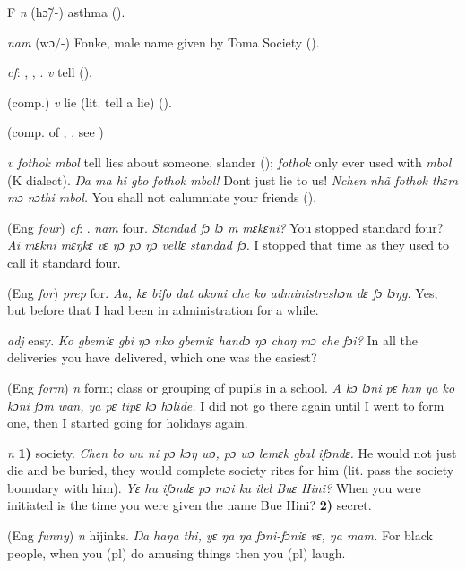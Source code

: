 \begin{letter}{F}
 \textit{n} (hɔ̃/-) asthma (\citealt{Pichl1967}).

 \textit{nam} (wɔ/-) Fonke, male name given by Toma Society (\citealt{Pichl1967}). 

 \textit{cf}: , , . \textit{v} tell (\citealt{Pichl1967}).

 (comp.) \textit{v} lie (lit. tell a lie) (\citealt{Pichl1967}). 

 (comp. of , , see ) 

 \textit{v} \textit{fothok mbol} tell lies about someone, slander (\citealt{Pichl1967}); \textit{fothok} only ever used with \textit{mbol} (K dialect). \textit{Ŋa ma hi gbo fothok mbol!} Dont just lie to us! \textit{Nchen nhã fothok thɛm mɔ nɔthi mbol.} You shall not calumniate your friends (\citealt{Pichl1967}). 

 (Eng \textit{four}) \textit{cf}: . \textit{nam} four. \textit{Standad fɔ lɔ m mɛkɛni?} You stopped standard four? \textit{Ai mɛkni mɛŋkɛ vɛ ŋɔ pɔ ŋɔ vellɛ standad fɔ.} I stopped that time as they used to call it standard four.

 (Eng \textit{for}) \textit{prep} for. \textit{Aa, kɛ bifo dat akoni che ko administreshɔn dɛ fɔ lɔŋg.} Yes, but before that I had been in administration for a while.

 \textit{adj} easy. \textit{Ko gbemiɛ gbi ŋɔ nko gbemiɛ handɔ ŋɔ chaŋ mɔ che fɔi?} In all the deliveries you have delivered, which one was the easiest?

 (Eng \textit{form}) \textit{n} form; class or grouping of pupils in a school. \textit{A kɔ lɔni pɛ haŋ ya ko kɔni fɔm wan, ya pɛ tipɛ kɔ hɔlide.} I did not go there again until I went to form one, then I started going for holidays again.

 \textit{n} \textbf{1)} society. \textit{Chen bo wu ni pɔ kɔŋ wɔ, pɔ wɔ lemɛk gbal ifɔndɛ.} He would not just die and be buried, they would complete society rites for him (lit. pass the society boundary with him). \textit{Yɛ hu ifɔndɛ pɔ mɔi ka ilel Buɛ Hini?} When you were initiated is the time you were given the name Bue Hini? \textbf{2)} secret.

 (Eng \textit{funny}) \textit{n} hijinks. \textit{Ŋa haŋa thi, yɛ ŋa ŋa fɔni-fɔniɛ vɛ, ŋa mam.} For black people, when you (pl) do amusing things then you (pl) laugh.


\end{letter}
